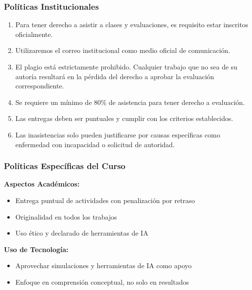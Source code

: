 \documentclass{beamer}
\begin{document}
\begin{frame}
	\frametitle{Políticas Institucionales}
	\begin{enumerate}
		\item Para tener derecho a asistir a clases y evaluaciones, es requisito estar inscritos oficialmente.
		\item Utilizaremos el correo institucional como medio oficial de comunicación.
		\item El plagio está estrictamente prohibido. Cualquier trabajo que no sea de su autoría resultará en la pérdida del derecho a aprobar la evaluación correspondiente.
		\item Se requiere un mínimo de 80\% de asistencia para tener derecho a evaluación.
		\item Las entregas deben ser puntuales y cumplir con los criterios establecidos.
		\item Las inasistencias solo pueden justificarse por causas específicas como enfermedad con incapacidad o solicitud de autoridad.
	\end{enumerate}

\end{frame}	

\begin{frame}
	\frametitle{Políticas Específicas del Curso}
	
	\textbf{Aspectos Académicos:}
	
	\begin{itemize}
		\item Entrega puntual de actividades con penalización por retraso
		\item Originalidad en todos los trabajos
		\item Uso ético y declarado de herramientas de IA
	\end{itemize}

	\textbf{Uso de Tecnología:}
	
	\begin{itemize}
		\item Aprovechar simulaciones y herramientas de IA como apoyo
		\item Enfoque en comprensión conceptual, no solo en resultados
	\end{itemize}
	
\end{frame}
\end{document}

